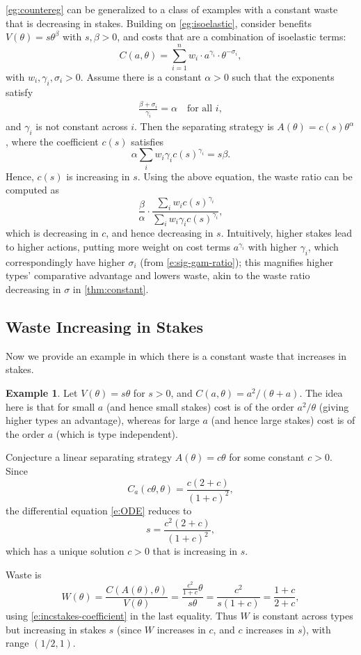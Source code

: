 \documentclass[12 pt]{article}
\theoremstyle{remark}
\theoremstyle{definition}
\newtheorem{example}{Example}
\begin{document}
\autoref{eg:countereg} can be generalized to a class of examples with a constant waste that is decreasing in stakes. Building on \autoref{eg:isoelastic}, consider benefits $V(\theta) = s\theta^\beta$ with $s,\beta>0$, and costs that are a combination of isoelastic terms:
\[
C(a, \theta) = \sum_{i=1}^n w_i \cdot a^{\gamma_i} \cdot \theta^{-\sigma_i},
\]
with $w_i,\gamma_i,\sigma_i > 0$. Assume there is a constant $\alpha>0$ such that the exponents satisfy
\begin{align}\label{e:sig-gam-ratio}
\frac{\beta + \sigma_i}{\gamma_i} = \alpha \quad \text{for all } i,
\end{align}
and $\gamma_i$ is not constant across $i$.
Then the separating strategy is $A(\theta) = c(s)\theta^\alpha$, where the coefficient $c(s)$ satisfies
\[
\alpha \sum_i w_i \gamma_i c(s)^{\gamma_i} = s\beta.
\]
Hence, $c(s)$ is increasing in $s$. 
Using the above equation, the waste ratio can be computed as
\[
\frac{\beta}{\alpha} \cdot \frac{\sum_i w_i c(s)^{\gamma_i}}{\sum_i w_i \gamma_i c(s)^{\gamma_i}},
\]
which is decreasing in $c$, and hence decreasing in $s$. Intuitively, higher stakes lead to higher actions, putting more weight on cost terms $a^{\gamma_i}$ with higher $\gamma_i$, which correspondingly have higher $\sigma_i$ (from \eqref{e:sig-gam-ratio}); this magnifies higher types' comparative advantage and lowers waste, akin to the waste ratio decreasing in $\sigma$ in \autoref{thm:constant}.

\subsection{Waste Increasing in Stakes}

Now we provide an example in which there is a constant waste that increases in stakes.

\begin{example}
\label{eg:countereg2}
Let $V(\theta)=s\theta$ for $s>0$, and $C(a,\theta)={a^2}/({\theta+a})$. The idea here is that for small $a$ (and hence small stakes) cost is of the order $a^2/\theta$ (giving higher types an advantage), whereas for large $a$ (and hence large stakes) cost is of the order $a$ (which is type independent).

Conjecture a linear separating strategy $A(\theta)=c\theta$ for some constant $c>0$. Since
\[
C_a(c\theta,\theta)=\frac{c(2+c)}{(1+c)^2},
\]
the differential equation \eqref{e:ODE} reduces to
\begin{equation}
\label{e:incstakes-coefficient}
s=\frac{c^2(2+c)}{(1+c)^2},
\end{equation}
which has a unique solution $c>0$ that is increasing in $s$.

Waste is
\[
W(\theta)=\frac{C(A(\theta),\theta)}{V(\theta)}
=\frac{\frac{c^2}{1+c}\theta}{s\theta}
=\frac{c^2}{s(1+c)}
=\frac{1+c}{2+c},
\]
using \eqref{e:incstakes-coefficient} in the last equality. Thus $W$ is constant across types but increasing in stakes $s$ (since $W$ increases in $c$, and $c$ increases in $s$), with range $(1/2,1)$.
\end{example}
\end{document}
